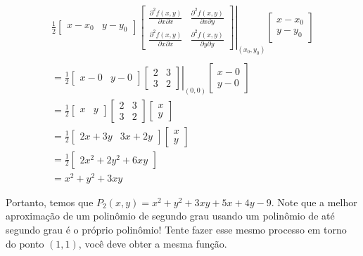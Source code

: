 \documentclass[
  letterpaper,
  DIV=11,
  numbers=noendperiod]{scrreprt}
\begin{document}
\[
\begin{aligned}
& \frac{1}{2} \begin{bmatrix} x-x_0 & y-y_0 \end{bmatrix}
\left. \begin{bmatrix} \frac{\partial^2{f(x,y)}}{\partial{x}\partial{x}} & \frac{\partial^2{f(x,y)}}{\partial{x}\partial{y}}\\ 
      \frac{\partial^2{f(x,y)}}{\partial{x}\partial{x}} & \frac{\partial^2{f(x,y)}}{\partial{y}\partial{y}} \end{bmatrix}
      \right |_{(x_0,y_0)}
\begin{bmatrix} x-x_0 \\ y-y_0 \end{bmatrix} & \\ \\
& = \frac{1}{2} \begin{bmatrix} x-0 & y-0 \end{bmatrix}
\left. \begin{bmatrix} 2 & 3\\ 
           3 & 2 \end{bmatrix}
           \right |_{(0,0)}
\begin{bmatrix} x-0 \\ y-0 \end{bmatrix} & \\
& = \frac{1}{2} \begin{bmatrix} x & y \end{bmatrix}
\begin{bmatrix} 2 & 3 \\ 3 & 2 \end{bmatrix}
\begin{bmatrix} x \\ y \end{bmatrix} & \\
& = \frac{1}{2} \begin{bmatrix} 2x+3y & 3x+2y \end{bmatrix}
\begin{bmatrix} x \\ y \end{bmatrix} & \\
& = \frac{1}{2} \begin{bmatrix} 2x^2+2y^2+6xy \end{bmatrix} &\\
& = x^2+y^2+3xy &
\end{aligned}
\]

Portanto, temos que \(P_2(x,y) = x^2+y^2+3xy+5x+4y-9\). Note que a
melhor aproximação de um polinômio de segundo grau usando um polinômio
de até segundo grau é o próprio polinômio! Tente fazer esse mesmo
processo em torno do ponto \((1,1)\), você deve obter a mesma função.
\end{document}
